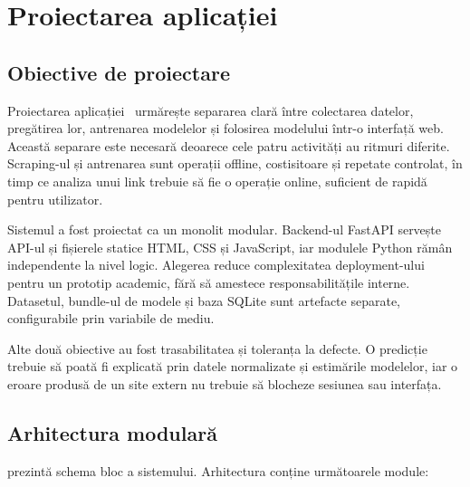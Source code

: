 \chapter{Proiectarea aplicației}
\label{chapter:application}

\section{Obiective de proiectare}
\label{sec:app-objectives}

Proiectarea aplicației \project\ urmărește separarea clară între colectarea datelor, pregătirea lor, antrenarea modelelor și folosirea modelului într-o interfață web. Această separare este necesară deoarece cele patru activități au ritmuri diferite. Scraping-ul și antrenarea sunt operații offline, costisitoare și repetate controlat, în timp ce analiza unui link trebuie să fie o operație online, suficient de rapidă pentru utilizator.

Sistemul a fost proiectat ca un monolit modular. Backend-ul FastAPI servește API-ul și fișierele statice HTML, CSS și JavaScript, iar modulele Python rămân independente la nivel logic. Alegerea reduce complexitatea deployment-ului pentru un prototip academic, fără să amestece responsabilitățile interne. Datasetul, bundle-ul de modele și baza SQLite sunt artefacte separate, configurabile prin variabile de mediu.

Alte două obiective au fost trasabilitatea și toleranța la defecte. O predicție trebuie să poată fi explicată prin datele normalizate și estimările modelelor, iar o eroare produsă de un site extern nu trebuie să blocheze sesiunea sau interfața.

\section{Arhitectura modulară}
\label{sec:app-overview}

 prezintă schema bloc a sistemului. Arhitectura conține următoarele module:

